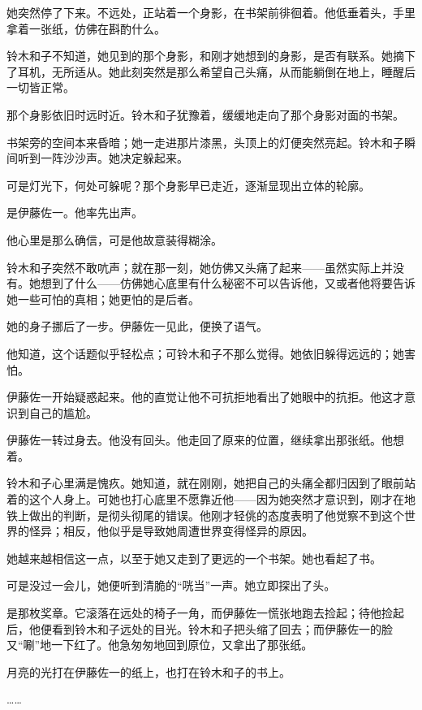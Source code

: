 她突然停了下来。不远处，正站着一个身影，在书架前徘徊着。他低垂着头，手里拿着一张纸，仿佛在斟酌什么。

铃木和子不知道，她见到的那个身影，和刚才她想到的身影，是否有联系。她摘下了耳机，无所适从。她此刻突然是那么希望自己头痛，从而能躺倒在地上，睡醒后一切皆正常。

那个身影依旧时远时近。铃木和子犹豫着，缓缓地走向了那个身影对面的书架。

书架旁的空间本来昏暗；她一走进那片漆黑，头顶上的灯便突然亮起。铃木和子瞬间听到一阵沙沙声。她决定躲起来。

可是灯光下，何处可躲呢？那个身影早已走近，逐渐显现出立体的轮廓。

是伊藤佐一。他率先出声。

他心里是那么确信，可是他故意装得糊涂。

铃木和子突然不敢吭声；就在那一刻，她仿佛又头痛了起来——虽然实际上并没有。她想到了什么——仿佛她心底里有什么秘密不可以告诉他，又或者他将要告诉她一些可怕的真相；她更怕的是后者。

她的身子挪后了一步。伊藤佐一见此，便换了语气。


他知道，这个话题似乎轻松点；可铃木和子不那么觉得。她依旧躲得远远的；她害怕。

伊藤佐一开始疑惑起来。他的直觉让他不可抗拒地看出了她眼中的抗拒。他这才意识到自己的尴尬。


伊藤佐一转过身去。他没有回头。他走回了原来的位置，继续拿出那张纸。他想着。

铃木和子心里满是愧疚。她知道，就在刚刚，她把自己的头痛全都归因到了眼前站着的这个人身上。可她也打心底里不愿靠近他——因为她突然才意识到，刚才在地铁上做出的判断，是彻头彻尾的错误。他刚才轻佻的态度表明了他觉察不到这个世界的怪异；相反，他似乎是导致她周遭世界变得怪异的原因。

她越来越相信这一点，以至于她又走到了更远的一个书架。她也看起了书。

可是没过一会儿，她便听到清脆的“咣当”一声。她立即探出了头。

是那枚奖章。它滚落在远处的椅子一角，而伊藤佐一慌张地跑去捡起；待他捡起后，他便看到铃木和子远处的目光。铃木和子把头缩了回去；而伊藤佐一的脸又“唰”地一下红了。他急匆匆地回到原位，又拿出了那张纸。

月亮的光打在伊藤佐一的纸上，也打在铃木和子的书上。

……


